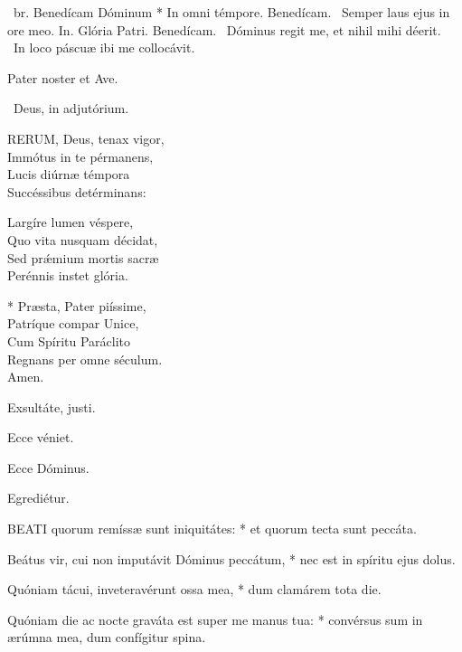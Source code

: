 \R\ br. Benedícam Dóminum * In omni témpore. Benedícam. \V\ Semper laus ejus in ore meo. In. Glória Patri. Benedícam. \V\ Dóminus regit me, et nihil mihi déerit. \R\ In loco páscuæ ibi me collocávit.



\sectionornament


Pater noster et Ave.

\V\ Deus, in adjutórium.


\lettrine[lines=2]{R}{ERUM}, Deus, tenax vigor,\\
Immótus in te pérmanens,\\
Lucis diúrnæ témpora\\
Succéssibus detérminans:

Largíre lumen véspere,\\
Quo vita nusquam décidat,\\
Sed prǽmium mortis sacræ\\
Perénnis instet glória.

* Præsta, Pater piíssime,\\
Patríque compar Unice,\\
Cum Spíritu Paráclito\\
Regnans per omne séculum.\\
Amen.

  Exsultáte, justi.


  Ecce véniet.

  Ecce Dóminus.

  Egrediétur.


\lettrine[lines=2]{B}{EATI} quorum remíssæ sunt iniquitátes: * et quorum tecta sunt peccáta.

Beátus vir, cui non imputávit Dóminus peccátum, * nec est in spíritu ejus dolus.

Quóniam tácui, inveteravérunt ossa mea, * dum clamárem tota die.

Quóniam die ac nocte graváta est super me manus tua: * convérsus sum in ærúmna mea, dum confígitur spina.

